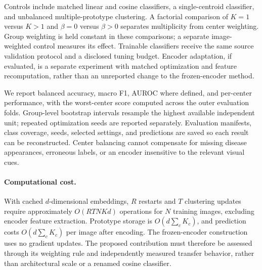 Controls include matched linear and cosine classifiers, a single-centroid classifier, and unbalanced multiple-prototype clustering. A factorial comparison of $K=1$ versus $K>1$ and $\beta=0$ versus $\beta>0$ separates multiplicity from center weighting. Group weighting is held constant in these comparisons; a separate image-weighted control measures its effect. Trainable classifiers receive the same source validation protocol and a disclosed tuning budget. Encoder adaptation, if evaluated, is a separate experiment with matched optimization and feature recomputation, rather than an unreported change to the frozen-encoder method.

We report balanced accuracy, macro F1, AUROC where defined, and per-center performance, with the worst-center score computed across the outer evaluation folds. Group-level bootstrap intervals resample the highest available independent unit; repeated optimization seeds are reported separately. Evaluation manifests, class coverage, seeds, selected settings, and predictions are saved so each result can be reconstructed. Center balancing cannot compensate for missing disease appearances, erroneous labels, or an encoder insensitive to the relevant visual cues.

\paragraph{Computational cost.}
With cached $d$-dimensional embeddings, $R$ restarts and $T$ clustering updates require approximately $O(RTNKd)$ operations for $N$ training images, excluding encoder feature extraction. Prototype storage is $O(d\sum_c K_c)$, and prediction costs $O(d\sum_c K_c)$ per image after encoding. The frozen-encoder construction uses no gradient updates. The proposed contribution must therefore be assessed through its weighting rule and independently measured transfer behavior, rather than architectural scale or a renamed cosine classifier.
